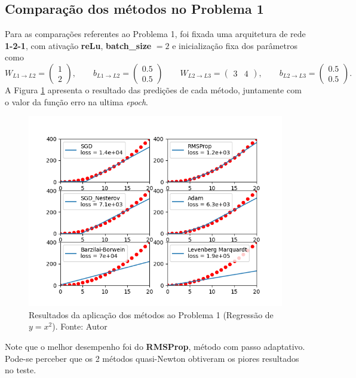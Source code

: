 \documentclass[11pt]{article}
\begin{document}
\subsection*{Comparação dos métodos no Problema 1}
Para as comparações referentes ao Problema 1, foi fixada uma arquitetura de rede \textbf{1-2-1}, com ativação \textbf{reLu}, \textbf{batch\_size} $ = 2$ e inicialização fixa dos parâmetros como 
$$W_{L1\rightarrow L2} = \begin{pmatrix} 1 \\ 2\end{pmatrix}, \qquad b_{L1\rightarrow L2} = \begin{pmatrix} 0.5 \\ 0.5\end{pmatrix}\qquad W_{L2\rightarrow L3} = \begin{pmatrix} 3 & 4\end{pmatrix}, \qquad b_{L2\rightarrow L3} = \begin{pmatrix} 0.5 \\ 0.5\end{pmatrix}.$$ 
A Figura \ref{REG} apresenta o resultado das predições de cada método, juntamente com o valor da função erro na ultima \textit{epoch}.

\begin{figure}[H]
\center
\includegraphics[scale=0.7]{Figuras/REG.png}
\caption{Resultados da aplicação dos métodos ao Problema 1 (Regressão de  $y = x^2$). Fonte: Autor} 
\label{REG}
\end{figure}


\noindent
Note que o melhor desempenho foi do \textbf{RMSProp}, método com passo adaptativo. Pode-se perceber que os 2 métodos quasi-Newton obtiveram os piores resultados no teste.
\end{document}
